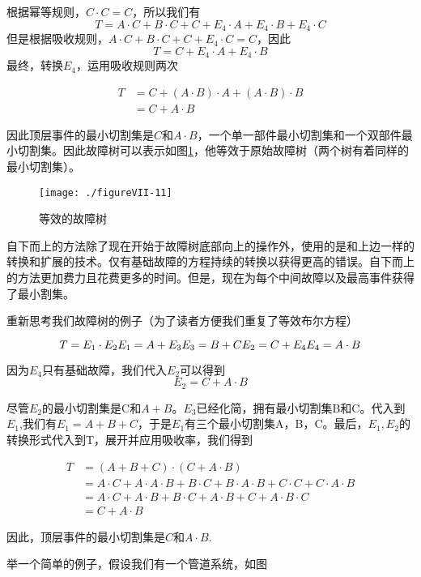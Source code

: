 \documentclass[cn,11pt,chinese]{elegantbook}
\begin{document}
{根据幂等规则，$C\cdot C=C$，所以我们有
$$T=A\cdot C+B\cdot C+C+E_4\cdot A+E_4\cdot B+E_4\cdot C$$
但是根据吸收规则，$A\cdot C+B\cdot C+C+E_4\cdot C=C$，因此
$$T=C+E_4\cdot A+E_4\cdot B$$
最终，转换$E_4$，运用吸收规则两次

\begin{align*}
T&=C+(A\cdot B)\cdot A+(A\cdot B)\cdot B
\\
&=C+A\cdot B
\end{align*}

因此顶层事件的最小切割集是$C$和$A\cdot B$，一个单一部件最小切割集和一个双部件最小切割集。因此故障树可以表示如图\ref{fig7-11}，他等效于原始故障树（两个树有着同样的最小切割集）。

\begin{figure}[H]
	\centering
	\texttt{[image: ./figureVII-11]}
	\caption{等效的故障树}\label{fig7-11}
\end{figure}

自下而上的方法除了现在开始于故障树底部向上的操作外，使用的是和上边一样的转换和扩展的技术。仅有基础故障的方程持续的转换以获得更高的错误。自下而上的方法更加费力且花费更多的时间。但是，现在为每个中间故障以及最高事件获得了最小割集。

重新思考我们故障树的例子（为了读者方便我们重复了等效布尔方程）

$$
T=E_1\cdot E_2 \\
E_1=A+E_3   \\
E_3=B+C \\
E_2=C+E_4   \\
E_4=A \cdot B    \\
$$

因为$E_4$只有基础故障，我们代入$E_2$可以得到
$$E_2=C+A\cdot B$$

尽管$E_2$的最小切割集是C和$A+B$。$E_3$已经化简，拥有最小切割集B和C。代入到$E_1$,我们有$E_1=A+B+C$，于是$E_1$有三个最小切割集A，B，C。最后，$E_1,E_2$的转换形式代入到T，展开并应用吸收率，我们得到

\begin{align*}
T&=(A+B+C)\cdot(C+A\cdot B) \\
&=A\cdot C+A\cdot A\cdot B+B\cdot C + B\cdot A\cdot B + C\cdot C+C\cdot A\cdot B \\
&=A\cdot C + A\cdot B+ B\cdot C + A\cdot B + C+A\cdot B\cdot C  \\
&=C+A\cdot B
\end{align*}

因此，顶层事件的最小切割集是$C$和$A\cdot B$.

举一个简单的例子，假设我们有一个管道系统，如图

}
\end{document}
